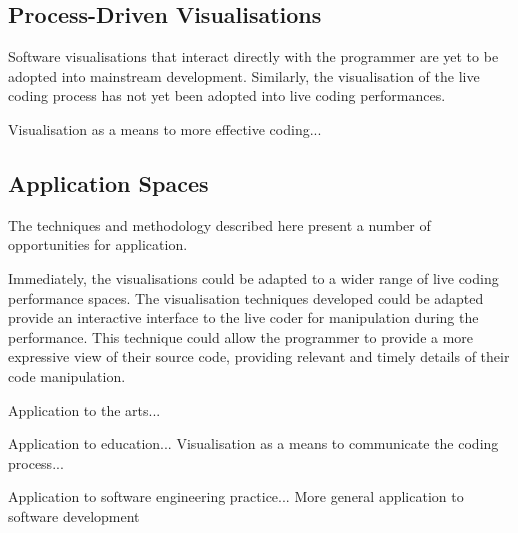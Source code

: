 \subsection{Process-Driven Visualisations}

Software visualisations that interact directly with the programmer are yet to be adopted into mainstream development. Similarly, the visualisation of the live coding process has not yet been adopted into live coding performances.


Visualisation as a means to more effective coding...

\subsection{Application Spaces}

The techniques and methodology described here present a number of opportunities for application.

Immediately, the visualisations could be adapted to a wider range of live coding performance spaces. The visualisation techniques developed could be adapted provide an interactive interface to the live coder for manipulation during the performance. This technique could allow the programmer to provide a more expressive view of their source code, providing relevant and timely details of their code manipulation. 

Application to the arts...

Application to education...
Visualisation as a means to communicate the coding process...

Application to software engineering practice...
More general application to software development


